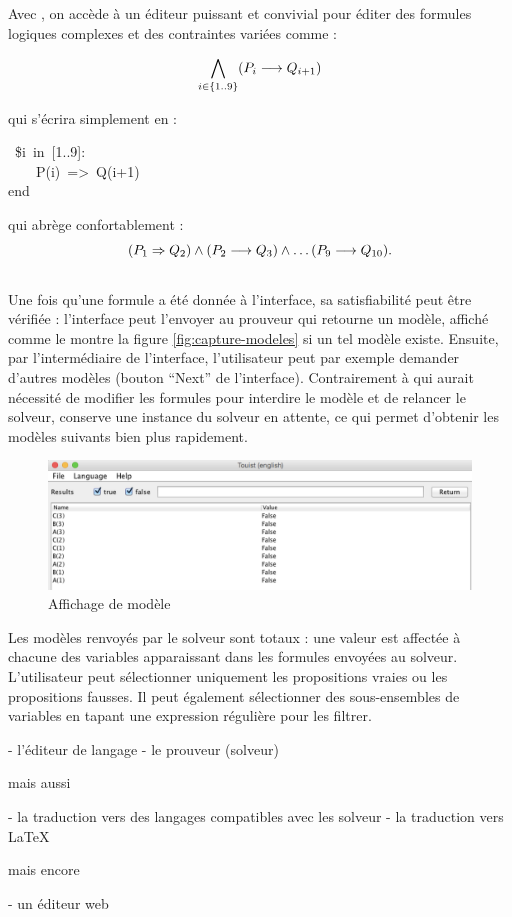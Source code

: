 Avec \touist , on accède à un éditeur puissant et convivial pour éditer des formules logiques complexes et des contraintes variées comme :

\[\bigwedge_{i \in \{1..9\}} (P_i \longrightarrow Q_{i+1})\]

\noindent
qui s'écrira simplement en \touist :
\begin{mdpre}%
~{\$i}~{in}~{}[{1}..{9}]:\\
~~~~P(i)~=\textgreater{}~Q(i+{1})\\
{end}%
\end{mdpre}%

\noindent
qui abrège confortablement :\\

\[(P_1 \Rightarrow Q_2) \wedge (P_2 \longrightarrow Q_3) \wedge \ldots (P_9\longrightarrow Q_{10}).\] 
\\


Une fois qu'une formule a été donnée à l'interface, sa satisfiabilité peut être vérifiée : l'interface peut l'envoyer au prouveur qui retourne un modèle, affiché comme le montre la figure \ref{fig:capture-modeles} si un tel modèle existe. Ensuite, par l'intermédiaire de l'interface, l'utilisateur peut par exemple demander d'autres modèles (bouton \enquote{Next} de l'interface). Contrairement à \satoulouse qui aurait nécessité de modifier les formules pour interdire le modèle et de relancer le solveur, \touist conserve une instance du solveur en attente, ce qui permet d'obtenir les modèles suivants bien plus rapidement.

\begin{figure}[htbp]
\centering
\includegraphics[scale=0.27]{figures/ExampleOfAModel.png}
  \caption{Affichage de modèle}
  \label{fig:ExampleOfAModel}
\end{figure}

Les modèles renvoyés par le solveur sont totaux : une valeur est affectée à chacune des variables apparaissant dans les formules envoyées au solveur. L'utilisateur peut sélectionner uniquement les propositions vraies ou les propositions fausses. Il peut également sélectionner des sous-ensembles de variables en tapant une expression régulière pour les filtrer.









- l'éditeur de langage \touist
- le prouveur (solveur)

mais aussi

- la traduction vers des langages compatibles avec les solveur
- la traduction vers \LaTeX

mais encore

- un éditeur web
